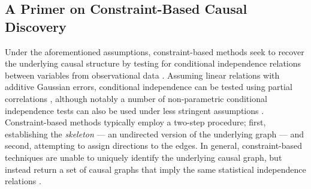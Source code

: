 \documentclass[twoside, 11pt]{article}
\begin{document}

\subsection{A Primer on Constraint-Based Causal Discovery} \label{primer}
Under the aforementioned assumptions, constraint-based methods seek to recover the underlying causal structure by testing for conditional independence relations between variables from observational data \citep{scheines_tetrad_1998}. Assuming linear relations with additive Gaussian errors, conditional independence can be tested using partial correlations \citep{lawrance_conditional_1976}, although notably a number of non-parametric conditional independence tests can also be used under less stringent assumptions \citep{li_fan2020, huang_sun_white_2016}. Constraint-based methods typically employ a two-step procedure; first, establishing the \textit{skeleton} --- an undirected version of the underlying graph --- and second, attempting to assign directions to the edges. In general, constraint-based techniques are unable to uniquely identify the underlying causal graph, but instead return a set of causal graphs that imply the same statistical independence relations \citep{spirtes2000}.


\end{document}
